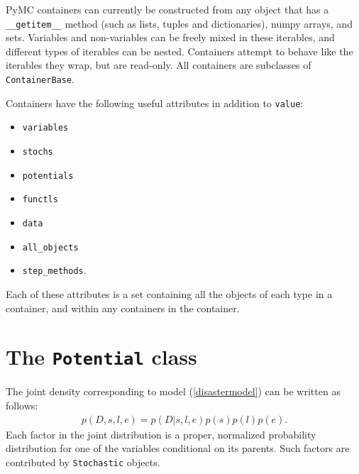 PyMC containers can currently be constructed from any object that has a \texttt{\_\_getitem\_\_} method (such as lists, tuples and dictionaries), numpy arrays, and sets. Variables and non-variables can be freely mixed in these iterables, and different types of iterables can be nested. Containers attempt to behave like the iterables they wrap, but are read-only. All containers are subclasses of \texttt{ContainerBase}.

Containers have the following useful attributes in addition to \texttt{value}:
\begin{itemize}
    \item\texttt{variables}
    \item\texttt{stochs}
    \item\texttt{potentials}
    \item\texttt{functls}
    \item\texttt{data}
    \item\texttt{all_objects}
    \item\texttt{step_methods}.
\end{itemize}
Each of these attributes is a set containing all the objects of each type in a container, and within any containers in the container.

\section{The \texttt{Potential} class}


The joint density corresponding to model (\ref{disastermodel}) can be written as follows:
\begin{eqnarray*}
    p(D,s,l,e) = p(D|s,l,e) p(s) p(l) p(e).
\end{eqnarray*}
Each factor in the joint distribution is a proper, normalized probability distribution for one of the variables conditional on its parents. Such factors are contributed by \texttt{Stochastic} objects.

